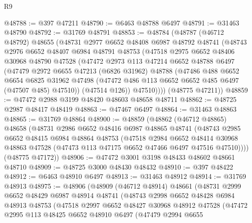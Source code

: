 \begin{lexlean}{R9}
\begin{coremodule}
@48788 := @397 @47211
@48790 := @6463 @48788 @6497
@48791 := @31463 @48790
@48792 := @31769 @48791
@48853 := @48784
    (@48787
      (@46712 @48792)
      @48655
      (@48731
        @2977
        @6652
        @48408
        @6987
        @48792
        @48741
        (@48743
          @2976
          @6652
          @48407
          @6984
          @48791
          @48753
          (@47518
            @2975
            @6652
            @48406
            @30968
            @48790
            @47528
            (@47472
              @2973
              @113
              @47214
              @6652
              @48788
              @6497
              (@47479
                @2972
                @6655
                @47213
                (@6826 @31962)
                @48788
                (@47486
                  @488
                  @6652
                  @6654
                  @6825
                  @31962
                  @47498
                  (@47472 @486 @113 @6652 @6652 @485 @6497 (@47507 @485) @47510))
                (@47514 @126))
              @47510))))
      (@48775 @47211))
@48859 := @47472 @2988 @3199 @48420 @48603 @48658 @48711
@48862 := @48725 @2987 @48417 @48419
@48863 := @47467 @6497
@48864 := @31463 @48863
@48865 := @31769 @48864
@48900 := @48859
    (@48862
      (@46712 @48865)
      @48658
      (@48731
        @2986
        @6652
        @48416
        @6987
        @48865
        @48741
        (@48743
          @2985
          @6652
          @48415
          @6984
          @48864
          @48753
          (@47518
            @2984
            @6652
            @48414
            @30968
            @48863
            @47528
            (@47473 @113 @47175 @6652 @47466 @6497 @47516 @47510))))
      (@48775 @47172))
@48906 := @47472 @3001 @3198 @48433 @48602 @48661 @48710
@48909 := @48725 @3000 @48430 @48432
@48910 := @397 @48422
@48912 := @6463 @48910 @6497
@48913 := @31463 @48912
@48914 := @31769 @48913
@48975 := @48906
    (@48909
      (@46712 @48914)
      @48661
      (@48731
        @2999
        @6652
        @48429
        @6987
        @48914
        @48741
        (@48743
          @2998
          @6652
          @48428
          @6984
          @48913
          @48753
          (@47518
            @2997
            @6652
            @48427
            @30968
            @48912
            @47528
            (@47472
              @2995
              @113
              @48425
              @6652
              @48910
              @6497
              (@47479
                @2994
                @6655

\end{coremodule}
\end{lexlean}
